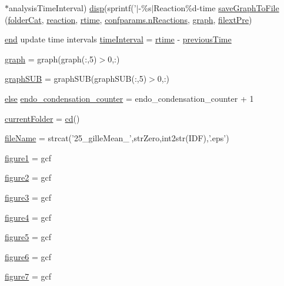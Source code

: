 \begin{DoxyCompactItemize}
$\ast$analysis\-Time\-Interval) \hyperlink{a00023_a609f02c862f2843febf3408f688be8e8}{disp}(sprintf('$|$-\/\%s$|$Reaction\%d-\/time \hyperlink{a00022_a95b8ff8a27bbc7e771fa2fdd279f2465}{save\-Graph\-To\-File} (\hyperlink{a00022_ac4793cb55101110d228ded89ce9caa48}{folder\-Cat}, \hyperlink{a00022_a4ba2ecb46f808729569ecce2cc1d34c6}{reaction}, \hyperlink{a00022_afc6b38657a313b9f1de2ee356910b6ee}{rtime}, \hyperlink{a00065_a8d704532b4b419f1428cb078bb5c7ffe}{confparams.\-n\-Reactions}, \hyperlink{a00022_a2745e24fec2a44d51f4452beb1596bd3}{graph}, \hyperlink{a00022_a527736a425f4f7ead2c2dc9d7b479346}{filext\-Pre})
\item 
\hyperlink{a00019_afb358f48b1646c750fb9da6c6585be2b}{end} update time intervals \hyperlink{a00022_a30a404fc0b2d3c996251dfd4adf5ec51}{time\-Interval} = \hyperlink{a00022_afc6b38657a313b9f1de2ee356910b6ee}{rtime} -\/ \hyperlink{a00022_a17b8652a085b5add031a40fb1c9a680e}{previous\-Time}
\item 
\hyperlink{a00022_a91819eaefb434ac459f17b3caa03713d}{graph} = graph(graph(\-:,5)$>$0,\-:)
\item 
\hyperlink{a00022_a0c738fa68cf19f3aeef6b6a7a723577c}{graph\-S\-U\-B} = graph\-S\-U\-B(graph\-S\-U\-B(\-:,5)$>$0,\-:)
\item 
\hyperlink{a00025_af5946383720aa572eb93e1e63afc23c2}{else} \hyperlink{a00022_ac7610da79e174cac91899b5a15014265}{endo\-\_\-condensation\-\_\-counter} = endo\-\_\-condensation\-\_\-counter + 1
\item 
\hyperlink{a00022_af393966a41271e721a03e544a1650f4a}{current\-Folder} = \hyperlink{a00065_abe327856a9ee2f30f3ccafe4dc9edf5e}{cd}()
\item 
\hyperlink{a00022_acbece2625a541230e9f9091adca38c8c}{file\-Name} = strcat('25\-\_\-gille\-Mean\-\_\-',str\-Zero,int2str(\-I\-D\-F),'.\-eps')
\item 
\hyperlink{a00022_aa04641698301ef27b9562e1a03d697cf}{figure1} = gcf
\item 
\hyperlink{a00022_a185ece7ea03635f3e9f36bce457bc6b0}{figure2} = gcf
\item 
\hyperlink{a00022_a49c05716a1aa25ef47e7b2a3cc3b7362}{figure3} = gcf
\item 
\hyperlink{a00022_a3910d94d7f9d81634d5102442e25d603}{figure4} = gcf
\item 
\hyperlink{a00022_aacba0a23b9337f688d1a0fc707f49bb8}{figure5} = gcf
\item 
\hyperlink{a00022_a6d1dba2624229e06f705f5eaa6e11a9b}{figure6} = gcf
\item 
\hyperlink{a00022_ad893b16e514321b512ee5c11fb5b7b0d}{figure7} = gcf

\end{DoxyCompactItemize}
